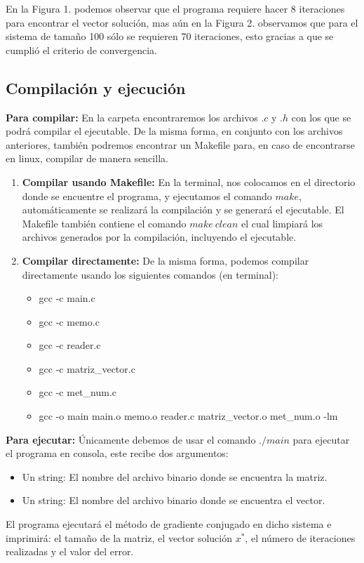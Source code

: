 \documentclass[12pt]{article}
\begin{document}
En la Figura 1. podemos observar que el programa requiere hacer 8 iteraciones para encontrar el vector solución, mas aún en la Figura 2. observamos que para el sistema de tamaño 100 sólo se requieren 70 iteraciones, esto gracias a que se cumplió el criterio de convergencia.\\

\subsection{Compilación y ejecución}
\textbf{Para compilar:} En la carpeta encontraremos los archivos $.c$ y $.h$ con los que se podrá compilar el ejecutable. De la misma forma, en conjunto con los archivos anteriores, también podremos encontrar un Makefile para, en caso de encontrarse en linux, compilar de manera sencilla.

\begin{enumerate}
	\item \textbf{Compilar usando Makefile:} En la terminal, nos colocamos en el directorio donde se encuentre el programa, y ejecutamos el comando $make$, automáticamente se realizará la compilación y se generará el ejecutable. El Makefile también contiene el comando $make\ clean$ el cual limpiará los archivos generados por la compilación, incluyendo el ejecutable.
	\item \textbf{Compilar directamente:} De la misma forma, podemos compilar directamente usando los siguientes comandos (en terminal):
	\begin{itemize}
		\item gcc -c main.c
		\item gcc -c memo.c
		\item gcc -c reader.c
		\item gcc -c matriz\_vector.c
		\item gcc -c met\_num.c
		\item gcc -o main main.o memo.o reader.c matriz\_vector.o met\_num.o -lm
	\end{itemize}
\end{enumerate}

\textbf{Para ejecutar:} Únicamente debemos de usar el comando $./main$ para ejecutar el programa en consola, este recibe dos argumentos:
\begin{itemize}
	\item Un string: El nombre del archivo binario donde se encuentra la matriz.
	\item Un string: El nombre del archivo binario donde se encuentra el vector.
\end{itemize}

El programa ejecutará el método de gradiente conjugado en dicho sistema e imprimirá: el tamaño de la matriz, el vector solución $x^*$, el número de iteraciones realizadas y el valor del error.
\end{document}
